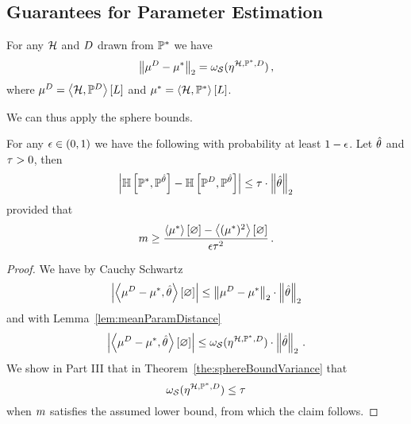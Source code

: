 \subsection{Guarantees for Parameter Estimation}



\begin{lemma}\label{lem:meanParamDistance}
	For any $\mathcal{H}$ and $D$ drawn from $\mathbb{P}^*$ we have
	\begin{align*}
		\left\|\mu^D - \mu^*\right\|_{2} 
		= \omega_{\mathcal{S}}(\eta^{\mathcal{H},\mathbb{P}^*,D}) \, ,
	\end{align*}
	where $\mu^D=\left\langle \mathcal{H},\mathbb{P}^{D}\right\rangle \left[ L \right]$ and $\mu^*=\left\langle \mathcal{H},\mathbb{P}^*\right\rangle \left[ L \right]$.
\end{lemma}

%
We can thus apply the sphere bounds.


\begin{theorem}
	For any $\epsilon\in(0,1)$ we have the following with probability at least $1-\epsilon$.
	Let $\hat{\theta}$ and $\tau>0$, then
		\[ \left|\mathbb{H}\left[\mathbb{P}^*,\mathbb{P}^{\hat{\theta}}\right] - \mathbb{H}\left[\mathbb{P}^{D},\mathbb{P}^{\hat{\theta}}\right]\right| \leq \tau \cdot \left\|\hat{\theta}\right\|_{2} \]
	provided that
		\[ m \geq \frac{\left\langle \mu^*\right\rangle \left[ \varnothing \right]-\left\langle (\mu^*)^2\right\rangle \left[ \varnothing \right]}{\epsilon \tau^2} \, . \]
\end{theorem}
\begin{proof}
	We have by Cauchy Schwartz 
		\[ \left|\left\langle \mu^D - \mu^*,\hat{\theta}\right\rangle \left[ \varnothing \right]\right| \leq \left\|\mu^D - \mu^*\right\|_{2} \cdot \left\|\hat{\theta}\right\|_{2}\]
	and with Lemma~\ref{lem:meanParamDistance}
		\[ \left|\left\langle \mu^D - \mu^*,\hat{\theta}\right\rangle \left[ \varnothing \right]\right| \leq \omega_{\mathcal{S}}(\eta^{\mathcal{H},\mathbb{P}^*,D}) \cdot \left\|\hat{\theta}\right\|_{2} \, . \]
	We show in Part III that in Theorem~\ref{the:sphereBoundVariance} that
		\[  \omega_{\mathcal{S}}(\eta^{\mathcal{H},\mathbb{P}^*,D}) \leq \tau \]
	when $m$ satisfies the assumed lower bound, from which the claim follows.
\end{proof}






